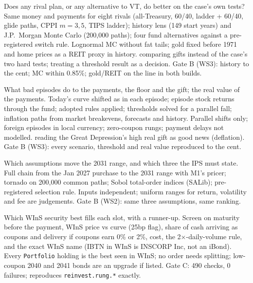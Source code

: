  Does any rival plan, or any alternative to VT, do better on the case's own tests?
 Same money and payments for eight rivals (all-Treasury, 60/40, ladder + 60/40, glide paths, CPPI $m=3,5$,
TIPS ladder); history lens (149 start years) and J.P.~Morgan Monte Carlo (200,000 paths); four fund alternatives
against a pre-registered switch rule.
 Lognormal MC without fat tails; gold fixed before 1971 and home prices as a REIT proxy in history.
 comparing gifts instead of the case's two hard tests; treating a threshold result as a decision.
 Gate B (WS3): history to the cent; MC within 0.85\%; gold/REIT on the line in both builds.

 What bad episodes do to the payments, the floor and the gift; the real value of the payments.
 Today's curve shifted as in each episode; episode stock returns through the fund; adopted rules
applied; thresholds solved for a parallel fall; inflation paths from market breakevens, forecasts and history.
 Parallel shifts only; foreign episodes in local currency; zero-coupon rungs; payment delays not modelled.
 reading the Great Depression's high real gift as good news (deflation).
 Gate B (WS3): every scenario, threshold and real value reproduced to the cent.

 Which assumptions move the 2031 range, and which three the IPS must state.
 Full chain from the Jan 2027 purchase to the 2031 range with M1's pricer; tornado on 200,000 common paths;
Sobol total-order indices (SALib); pre-registered selection rule.
 Inputs independent; uniform ranges for return, volatility and fee are judgements.
 Gate B (WS2): same three assumptions, same ranking.

 Which WInS security best fills each slot, with a runner-up.
 Screen on maturity before the payment, WInS price vs curve (25bp flag), share of cash arriving as coupons
and delivery if coupons earn 0\% or 2\%, cost, the 2$\times$-daily-volume rule, and the exact WInS name (IBTN in WInS is
INSCORP Inc, not an iBond).
 Every \texttt{Portfolio} holding is the best seen in WInS; no order needs splitting; low-coupon 2040 and
2041 bonds are an upgrade if listed.
 Gate C: 490 checks, 0 failures; reproduces \texttt{reinvest.rung.*} exactly.
\normalsize
